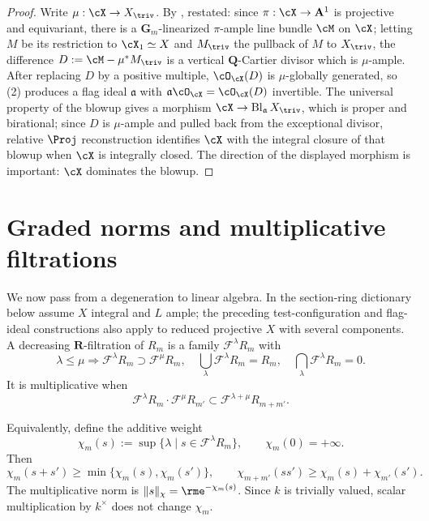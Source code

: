 \begin{proof}
Write $\mu:\cX\to X_{\triv}$.  By \cite[Lemma~1.8]{BJ22}, restated: since
$\pi:\cX\to\mathbf A^1$ is projective and equivariant, there is a
$\mathbf G_m$-linearized $\pi$-ample line bundle $\cM$ on $\cX$; letting
$M$ be its restriction to $\cX_1\simeq X$ and $M_{\triv}$ the pullback
of $M$ to $X_{\triv}$, the difference
$D:=\cM-\mu^\ast M_{\triv}$ is a vertical $\mathbf Q$-Cartier divisor
which is $\mu$-ample.  After replacing $D$ by a positive multiple,
$\cO_{\cX}(D)$ is $\mu$-globally generated, so
\,(2)
produces a flag ideal $\mathfrak a$ with
$\mathfrak a\cO_{\cX}=\cO_{\cX}(D)$ invertible.  The universal property
of the blowup gives a morphism $\cX\to\operatorname{Bl}_{\mathfrak a}
X_{\triv}$, which is proper and birational; since $D$ is
$\mu$-ample and pulled back from the exceptional divisor, relative
$\Proj$ reconstruction identifies $\cX$ with the integral closure of
that blowup when $\cX$ is integrally closed.  The direction of the
displayed morphism is important: $\cX$ dominates the blowup.
\end{proof}

\section{Graded norms and multiplicative filtrations}
\label{sec:ch33-norms}

We now pass from a degeneration to linear algebra.  In the section-ring
dictionary below assume $X$ integral and $L$ ample; the preceding
test-configuration and flag-ideal constructions also apply to reduced
projective $X$ with several components.  A decreasing
$\mathbf R$-filtration of $R_m$ is a family
$\mathcal F^\lambda R_m$ with
\begin{equation}
\label{eq:decreasing-filtration}
 \lambda\leq\mu\Longrightarrow
 \mathcal F^\lambda R_m\supset\mathcal F^\mu R_m,
 \quad
 \bigcup_\lambda\mathcal F^\lambda R_m=R_m,
 \quad
 \bigcap_\lambda\mathcal F^\lambda R_m=0.
\end{equation}
It is multiplicative when
\begin{equation}
\label{eq:multiplicative-filtration}
 \mathcal F^\lambda R_m\cdot\mathcal F^\mu R_{m'}
       \subset\mathcal F^{\lambda+\mu}R_{m+m'}.
\end{equation}

Equivalently, define the additive weight
\begin{equation}
\label{eq:additive-graded-norm}
 \chi_m(s):=\sup\{\lambda\mid s\in\mathcal F^\lambda R_m\},
 \qquad \chi_m(0)=+\infty .
\end{equation}
Then
\begin{equation}
\label{eq:graded-norm-inequalities}
 \chi_m(s+s')\geq\min\{\chi_m(s),\chi_m(s')\},\qquad
 \chi_{m+m'}(ss')\geq\chi_m(s)+\chi_{m'}(s').
\end{equation}
The multiplicative norm is $\|s\|_\chi=\rme^{-\chi_m(s)}$.  Since $k$ is
trivially valued, scalar multiplication by $k^\times$ does not change
$\chi_m$.

